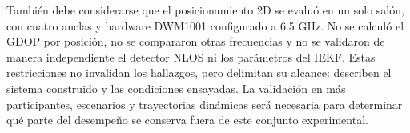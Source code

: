 También debe considerarse que el posicionamiento 2D se evaluó en un solo salón, con cuatro anclas y hardware DWM1001 configurado a 6.5 GHz. No se calculó el GDOP por posición, no se compararon otras frecuencias y no se validaron de manera independiente el detector NLOS ni los parámetros del IEKF. Estas restricciones no invalidan los hallazgos, pero delimitan su alcance: describen el sistema construido y las condiciones ensayadas. La validación en más participantes, escenarios y trayectorias dinámicas será necesaria para determinar qué parte del desempeño se conserva fuera de este conjunto experimental.
